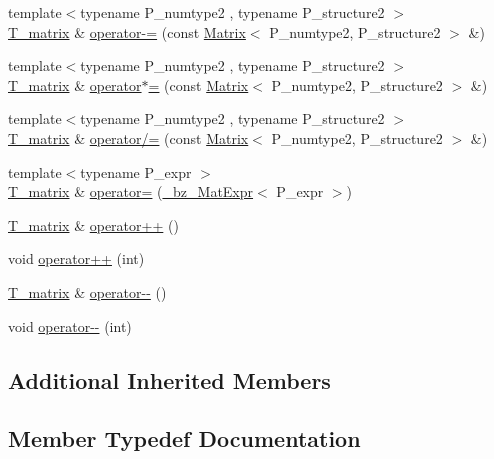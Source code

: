 \begin{DoxyCompactItemize}
{\footnotesize template$<$typename P\+\_\+numtype2 , typename P\+\_\+structure2 $>$ }\\\hyperlink{classMatrix_ae07f7dfb83325c5854333ed7e85d2ebb}{T\+\_\+matrix} \& \hyperlink{classMatrix_ab7bdb05c15f65a9c8a04fd3f01e0a423}{operator-\/=} (const \hyperlink{classMatrix}{Matrix}$<$ P\+\_\+numtype2, P\+\_\+structure2 $>$ \&)
\item 
{\footnotesize template$<$typename P\+\_\+numtype2 , typename P\+\_\+structure2 $>$ }\\\hyperlink{classMatrix_ae07f7dfb83325c5854333ed7e85d2ebb}{T\+\_\+matrix} \& \hyperlink{classMatrix_a59c8ceca3eedfd59675b6561e5a5bd6d}{operator$\ast$=} (const \hyperlink{classMatrix}{Matrix}$<$ P\+\_\+numtype2, P\+\_\+structure2 $>$ \&)
\item 
{\footnotesize template$<$typename P\+\_\+numtype2 , typename P\+\_\+structure2 $>$ }\\\hyperlink{classMatrix_ae07f7dfb83325c5854333ed7e85d2ebb}{T\+\_\+matrix} \& \hyperlink{classMatrix_a8e6686056994706ba94d14f2198227e2}{operator/=} (const \hyperlink{classMatrix}{Matrix}$<$ P\+\_\+numtype2, P\+\_\+structure2 $>$ \&)
\item 
{\footnotesize template$<$typename P\+\_\+expr $>$ }\\\hyperlink{classMatrix_ae07f7dfb83325c5854333ed7e85d2ebb}{T\+\_\+matrix} \& \hyperlink{classMatrix_a41fc72446aeec5e64f8391fe4c9d1226}{operator=} (\hyperlink{class__bz__MatExpr}{\+\_\+bz\+\_\+\+Mat\+Expr}$<$ P\+\_\+expr $>$)
\item 
\hyperlink{classMatrix_ae07f7dfb83325c5854333ed7e85d2ebb}{T\+\_\+matrix} \& \hyperlink{classMatrix_ad3dc8cdf857c29e70ecdf606eaa5e893}{operator++} ()
\item 
void \hyperlink{classMatrix_a94c4061ae4d963408cd3f9e4a611daef}{operator++} (int)
\item 
\hyperlink{classMatrix_ae07f7dfb83325c5854333ed7e85d2ebb}{T\+\_\+matrix} \& \hyperlink{classMatrix_a5c90036a8cb89645d761d77ee14462fc}{operator-\/-\/} ()
\item 
void \hyperlink{classMatrix_a0f3f165869af9b9a63e18507164e189d}{operator-\/-\/} (int)
\end{DoxyCompactItemize}
\subsection*{Additional Inherited Members}


\subsection{Member Typedef Documentation}
\hypertarget{classMatrix_ae07f7dfb83325c5854333ed7e85d2ebb}{}
